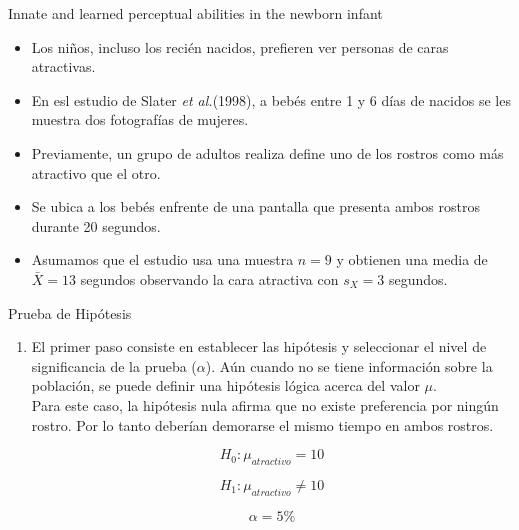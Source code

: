 \documentclass{beamer}
\newcounter{saveenumi}
\newcommand{\seti}{\setcounter{saveenumi}{\value{enumi}}}
\begin{document}
\begin{frame}{Innate and learned perceptual abilities in the newborn infant}
	\begin{itemize}
		\justifying
		\item Los niños, incluso los recién nacidos, prefieren ver personas de caras atractivas.
		\item En esl estudio de Slater \emph{et al.}(1998), a bebés entre 1 y 6 días de nacidos se les muestra dos fotografías de mujeres. 
		\item Previamente, un grupo de adultos realiza define uno de los rostros como más atractivo que el otro. 
		\item Se ubica a los bebés enfrente de una pantalla que presenta ambos rostros durante 20 segundos.
		\item Asumamos que el estudio usa una muestra $n=9$ y obtienen una media de $\bar{X}=13$ segundos observando la cara atractiva con $s_X=3$ segundos.
	\end{itemize}
\end{frame}

\begin{frame}{Prueba de Hipótesis}
\begin{enumerate}
\justifying
\item El primer paso consiste en establecer las hipótesis y seleccionar el nivel de significancia de la prueba ($\alpha$). Aún cuando no se tiene información sobre la población, se puede definir una hipótesis lógica acerca del valor $\mu$. \\

Para este caso, la hipótesis nula afirma que no existe preferencia por ningún rostro. Por lo tanto deberían demorarse el mismo tiempo en ambos rostros.

$$H_0:\mu_{atractivo}=10$$

$$H_1:\mu_{atractivo}\neq10$$

$$\alpha=5\%$$
\seti
\end{enumerate}
\end{frame}
\end{document}
